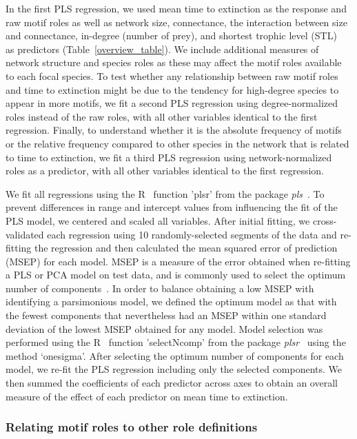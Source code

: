 \documentclass[12pt]{article}
\begin{document}
			
			In the first PLS regression, we used mean time to extinction as the response and raw motif roles as well as network size, connectance, the interaction between size and connectance, in-degree (number of prey), and shortest trophic level (STL)~\citep{Hairston1993} as predictors (Table~\ref{overview_table}).
			We include additional measures of network structure and species roles as these may affect the motif roles available to each focal species.
			To test whether any relationship between raw motif roles and time to extinction might be due to the tendency for high-degree species to appear in more motifs, we fit a second PLS regression using degree-normalized roles instead of the raw roles, with all other variables identical to the first regression.
			Finally, to understand whether it is the absolute frequency of motifs or the relative frequency compared to other species in the network that is related to time to extinction, we fit a third PLS regression using network-normalized roles as a predictor, with all other variables identical to the first regression.
			
			
			We fit all regressions using the R~\citep{R} function 'plsr' from the package \emph{pls}~\citep{pls}.
			To prevent differences in range and intercept values from influencing the fit of the PLS model, we centered and scaled all variables.
			After initial fitting, we cross-validated each regression using 10 randomly-selected segments of the data and re-fitting the regression and then calculated the mean squared error of prediction (MSEP) for each model.
			MSEP is a measure of the error obtained when re-fitting a PLS or PCA model on test data, and is commonly used to select the optimum number of components~\citep{Mevik2004}.
			In order to balance obtaining a low MSEP with identifying a parsimonious model, we defined the optimum model as that with the fewest components that nevertheless had an MSEP within one standard deviation of the lowest MSEP obtained for any model.
			Model selection was performed using the R~\citep{R} function 'selectNcomp' from the package \emph{plsr}~\citep{pls} using the method `onesigma'.
			After selecting the optimum number of components for each model, we re-fit the PLS regression including only the selected components. 
			We then summed the coefficients of each predictor across axes to obtain an overall measure of the effect of each predictor on mean time to extinction.


		\subsubsection*{Relating motif roles to other role definitions}
		
\end{document}
